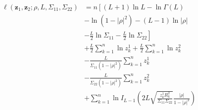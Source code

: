 \documentclass[journal]{IEEEtran}
\begin{document}
%
\begin{equation}\label{eq_log_vero_biv_prod_red}
\begin{split}
\ell(\bm z_1, \bm z_2;\rho, L, \Sigma_{11}, \Sigma_{22})&=n\left[(L+1)\ln L - \ln\Gamma(L)\right. \\
                        &- \ln(1-|\rho|^2)-(L-1)\ln|\rho| \\
	                    &-\left.\frac{L}{2}\ln\Sigma_{11}-\frac{L}{2}\ln\Sigma_{22}\right] \\
                        &+\frac{L}{2}\sum_{k=1}^{n} \ln z_k^1 +\frac{L}{2} \sum_{k=1}^{n}\ln z_k^2\\
                        &-\frac{L}{\Sigma_{11}(1-|\rho|^2)}\sum_{k=1}^{n}z_k^1\\
                        &-\frac{L}{\Sigma_{22}(1-|\rho|^2)}\sum_{k=1}^{n}z_k^2\\
	&+\sum_{k=1}^{n}\ln I_{L-1}\left(2L\sqrt{\frac{z_k^1R_k^2}{\Sigma_{11}\Sigma_{22}}}\frac{|\rho|}{1-|\rho|^2}\right)
\end{split}
 \end{equation} 
\end{document}
